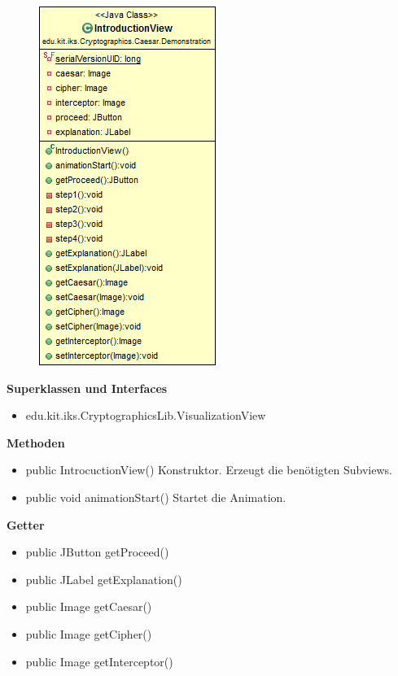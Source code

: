 \documentclass{article}
\begin{document}
      \begin{figure}[H]
        \centering
        \includegraphics{resources/edu-kit-iks-Cryptographics-Caesar-Demonstration-IntroductionView}
      \end{figure}

      \textbf{Superklassen und Interfaces}
      \begin{itemize}
        \item edu.kit.iks.CryptographicsLib.VisualizationView
      \end{itemize}

      \textbf{Methoden}
      \begin{itemize}
        \item public IntrocuctionView() \newline
        Konstruktor. Erzeugt die benötigten Subviews.
        \item public void animationStart() \newline
        Startet die Animation.
      \end{itemize}

      \textbf{Getter}
      \begin{itemize}
        \item public JButton getProceed()
        \item public JLabel getExplanation()
        \item public Image getCaesar()
        \item public Image getCipher()
        \item public Image getInterceptor()
      \end{itemize}
\end{document}
